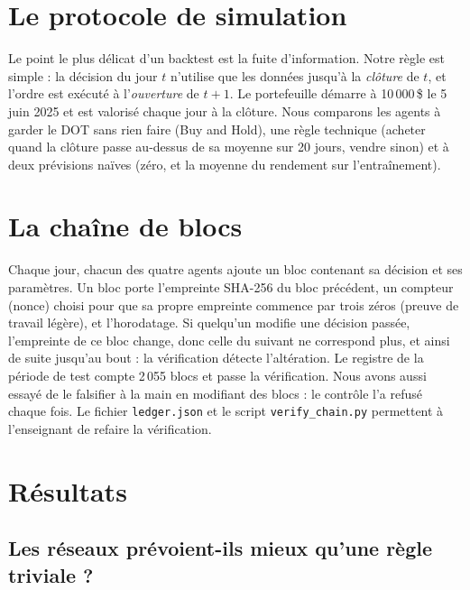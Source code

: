 \documentclass[11pt,a4paper]{article}
\newcommand{\dollar}{\,\$}
\begin{document}
\section{Le protocole de simulation}\label{sec:protocole}

Le point le plus délicat d'un backtest est la fuite d'information. Notre règle est simple : la décision du jour $t$ n'utilise que les données jusqu'à la
\emph{clôture} de $t$, et l'ordre est exécuté à l'\emph{ouverture} de $t+1$. Le portefeuille démarre à 10\,000\dollar{} le 5 juin 2025 et est valorisé
chaque jour à la clôture. Nous comparons les agents à garder le DOT sans rien faire (Buy and Hold), une règle technique
(acheter quand la clôture passe au-dessus de sa moyenne sur 20 jours, vendre sinon) et à deux prévisions naïves (zéro, et la moyenne du rendement
sur l'entraînement).

\section{La chaîne de blocs}\label{sec:chaine}

Chaque jour, chacun des quatre agents ajoute un bloc contenant sa décision et ses paramètres. Un bloc porte l'empreinte SHA-256 du bloc précédent,
un compteur (nonce) choisi pour que sa propre empreinte commence par trois zéros (preuve de travail légère), et l'horodatage. Si quelqu'un modifie
une décision passée, l'empreinte de ce bloc change, donc celle du suivant ne correspond plus, et ainsi de suite jusqu'au bout : la vérification
détecte l'altération. Le registre de la période de test compte 2\,055 blocs et passe la vérification. Nous avons aussi essayé de le falsifier
à la main en modifiant des blocs : le contrôle l'a refusé chaque fois. Le fichier \texttt{ledger.json}
et le script \texttt{verify\_chain.py} permettent à l'enseignant de refaire la vérification.

\section{Résultats}\label{sec:resultats}

\subsection{Les réseaux prévoient-ils mieux qu'une règle triviale ?}
\end{document}
